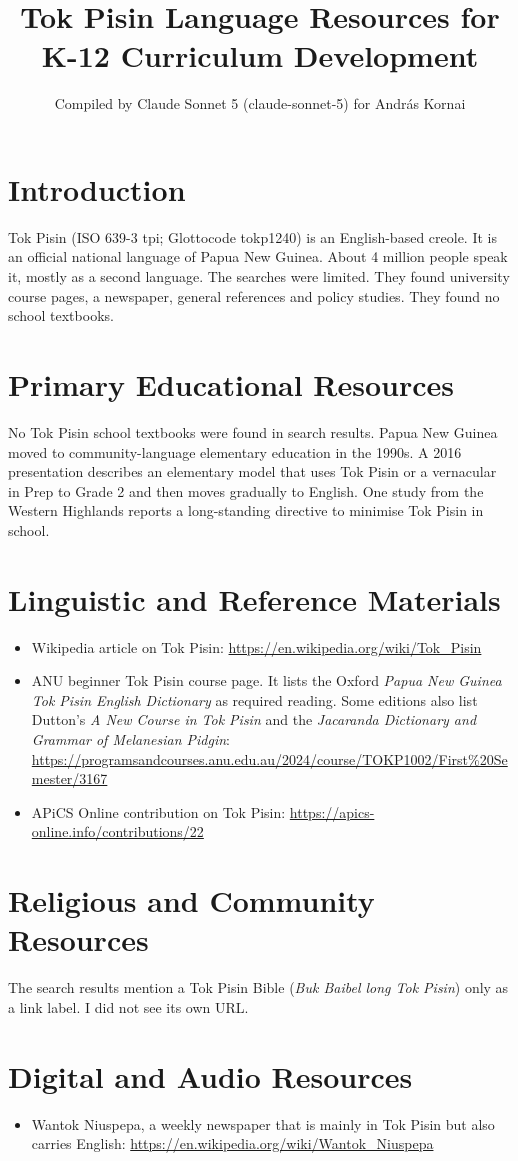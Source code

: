 \documentclass[12pt]{article}
\title{Tok Pisin Language Resources for K-12 Curriculum Development}
\author{Compiled by Claude Sonnet 5 (claude-sonnet-5) for Andr\'as Kornai}
\date{}
\begin{document}
\maketitle
\section{Introduction}
Tok Pisin (ISO 639-3 tpi; Glottocode tokp1240) is an English-based creole. It is an official national language of Papua New Guinea. About 4 million people speak it, mostly as a second language. The searches were limited. They found university course pages, a newspaper, general references and policy studies. They found no school textbooks.
\section{Primary Educational Resources}
No Tok Pisin school textbooks were found in search results. Papua New Guinea moved to community-language elementary education in the 1990s. A 2016 presentation describes an elementary model that uses Tok Pisin or a vernacular in Prep to Grade 2 and then moves gradually to English. One study from the Western Highlands reports a long-standing directive to minimise Tok Pisin in school.
\section{Linguistic and Reference Materials}
\begin{itemize}
\item Wikipedia article on Tok Pisin: \url{https://en.wikipedia.org/wiki/Tok_Pisin}
\item ANU beginner Tok Pisin course page. It lists the Oxford \emph{Papua New Guinea Tok Pisin English Dictionary} as required reading. Some editions also list Dutton's \emph{A New Course in Tok Pisin} and the \emph{Jacaranda Dictionary and Grammar of Melanesian Pidgin}: \url{https://programsandcourses.anu.edu.au/2024/course/TOKP1002/First%20Semester/3167}
\item APiCS Online contribution on Tok Pisin: \url{https://apics-online.info/contributions/22}
\end{itemize}
\section{Religious and Community Resources}
The search results mention a Tok Pisin Bible (\emph{Buk Baibel long Tok Pisin}) only as a link label. I did not see its own URL.
\section{Digital and Audio Resources}
\begin{itemize}
\item Wantok Niuspepa, a weekly newspaper that is mainly in Tok Pisin but also carries English: \url{https://en.wikipedia.org/wiki/Wantok_Niuspepa}
\end{itemize}
\end{document}
